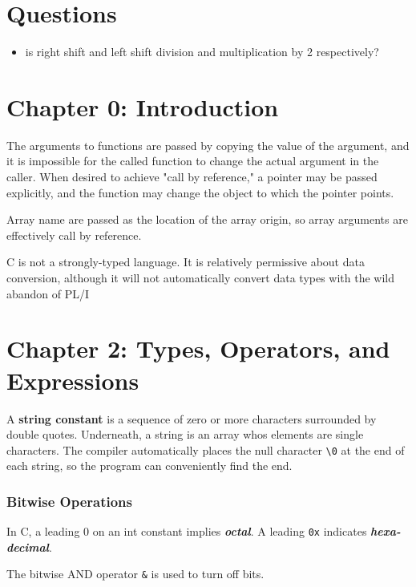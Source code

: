 \documentclass[12pt]{article}
\begin{document}
\section*{Questions}
\begin{itemize}
    \item is right shift and left shift division and multiplication by 2 respectively?
\end{itemize}
\section*{Chapter 0: Introduction}

The arguments to functions are passed by copying the value of the argument, and it is impossible for the called function to change the actual argument in the caller. When desired to achieve "call by reference," a pointer may be passed explicitly, and the function may change the object to which the pointer points.

Array name are passed as the location of the array origin, so array arguments are effectively call by reference.

C is not a strongly-typed language. It is relatively permissive about data conversion, although it will not automatically convert data types with the wild abandon of PL/I




\section*{Chapter 2: Types, Operators, and Expressions}

A \textbf{string constant} is a sequence of zero or more characters surrounded by double quotes. Underneath, a string is an array whos elements are single characters. The compiler automatically places the null character \lstinline|\0| at the end of each string, so the program can conveniently find the end.

\subsubsection*{Bitwise Operations}
In C, a leading 0 on an int constant implies \emph{\textbf{octal}}. A leading \lstinline|0x| indicates \emph{\textbf{hexa-decimal}}.

The bitwise AND operator \lstinline|&| is used to turn off bits.
\end{document}
